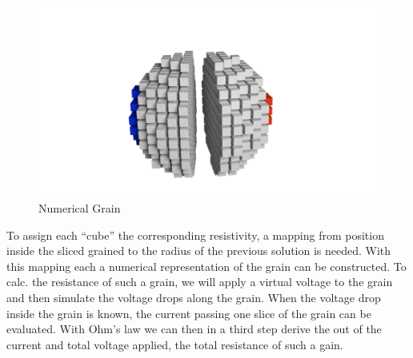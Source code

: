 \documentclass[11pt]{article}
\begin{document}
\begin{figure}
\centering
\includegraphics{media/pics/sliced_cube.png}
\caption{Numerical Grain}
\end{figure}

    To assign each ``cube'' the corresponding resistivity, a mapping from
position inside the sliced grained to the radius of the previous
solution is needed. With this mapping each a numerical representation of
the grain can be constructed. To calc. the resistance of such a grain,
we will apply a virtual voltage to the grain and then simulate the
voltage drops along the grain. When the voltage drop inside the grain is
known, the current passing one slice of the grain can be evaluated. With
Ohm's law we can then in a third step derive the out of the current and
total voltage applied, the total resistance of such a gain.
\end{document}
